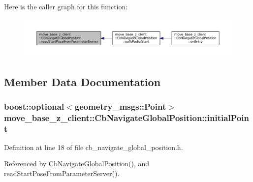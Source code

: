 Here is the caller graph for this function\+:
\nopagebreak
\begin{figure}[H]
\begin{center}
\leavevmode
\includegraphics[width=350pt]{classmove__base__z__client_1_1CbNavigateGlobalPosition_a866ea02c9e25ac1df9df88272deb04b3_icgraph}
\end{center}
\end{figure}




\subsection{Member Data Documentation}
\subsubsection[{\texorpdfstring{initial\+Point}{initialPoint}}]{\setlength{\rightskip}{0pt plus 5cm}boost\+::optional$<$geometry\+\_\+msgs\+::\+Point$>$ move\+\_\+base\+\_\+z\+\_\+client\+::\+Cb\+Navigate\+Global\+Position\+::initial\+Point}\hypertarget{classmove__base__z__client_1_1CbNavigateGlobalPosition_a603d293ad4557e8332fcfd264d7075d4}{}\label{classmove__base__z__client_1_1CbNavigateGlobalPosition_a603d293ad4557e8332fcfd264d7075d4}


Definition at line 18 of file cb\+\_\+navigate\+\_\+global\+\_\+position.\+h.



Referenced by Cb\+Navigate\+Global\+Position(), and read\+Start\+Pose\+From\+Parameter\+Server().

